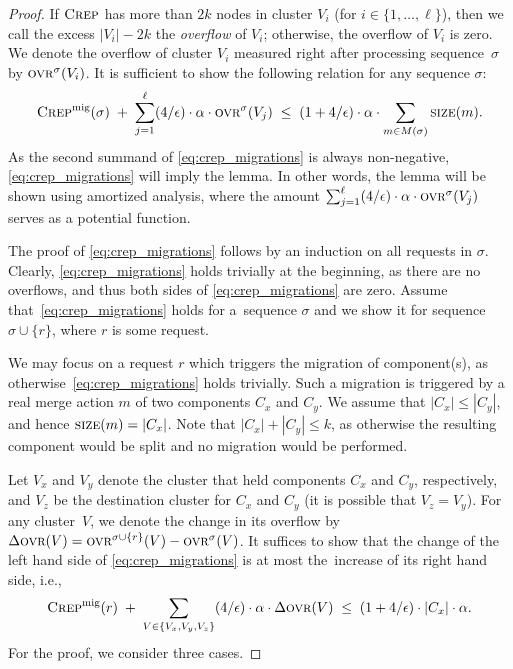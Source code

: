 \begin{proof}
If $\textsc{Crep}$ has more than $2 k$ nodes in cluster $V_i$ (for $i \in
\{1,\ldots,\ell\}$), then we call the excess $|V_i| - 2 k$ the \emph{overflow} of $V_i$;
otherwise, the overflow of $V_i$ is zero. We denote the overflow of cluster
$V_i$ measured right after processing sequence~$\sigma$ by $\textsc{ovr}^\sigma(V_i)$.
It is sufficient to show the following relation for any sequence $\sigma$:
\begin{equation}
\label{eq:crep_migrations}
 \textsc{Crep}^\textnormal{mig}(\sigma) \;+\; \sum_{j=1}^\ell (4/\epsilon) \cdot \alpha \cdot \textsc{ovr}^\sigma(V_j) 
 \; \leq \; (1+4/\epsilon)  \cdot \alpha \cdot \sum_{m \in M(\sigma)} \textsc{size}(m).
\end{equation}
As the second summand of \eqref{eq:crep_migrations} is always non-negative,
\eqref{eq:crep_migrations} will imply the lemma. 
In other words, the lemma will be shown using amortized analysis, where
the amount $\sum_{j=1}^\ell (4/\epsilon) \cdot \alpha \cdot \textsc{ovr}^\sigma(V_j)$ serves 
as a potential function.

The proof of \eqref{eq:crep_migrations} follows by an induction on all
requests in $\sigma$. Clearly, \eqref{eq:crep_migrations} holds trivially at the
beginning, as there are no overflows, and thus both sides of
\eqref{eq:crep_migrations} are zero. Assume that~\eqref{eq:crep_migrations}
holds for a~sequence $\sigma$ and we show it for sequence $\sigma \cup \{ r \}$,
where $r$ is some request.

We may focus on a request $r$ which triggers the migration of
component(s), as otherwise~\eqref{eq:crep_migrations} holds trivially. Such a migration is triggered by a
real merge action $m$ of two components $C_x$ and $C_y$. We assume that $|C_x|
\leq |C_y|$, and hence $\textsc{size}(m) = |C_x|$. Note that $|C_x| + |C_y| \leq k$,
as otherwise the resulting component would be split and no migration would
be performed.

Let $V_x$ and $V_y$ denote the cluster that held components $C_x$ and $C_y$,
respectively, and $V_z$ be the destination cluster for $C_x$ and $C_y$ (it is
possible that $V_z = V_y$). For any cluster~$V$, we denote the change in 
its overflow by $\Delta \textsc{ovr}(V) = \textsc{ovr}^{\sigma \cup \{r\}}(V) - \textsc{ovr}^\sigma(V)$. 
It suffices to show that the
change of the left hand side of \eqref{eq:crep_migrations} is at most
the~increase of its right hand side, i.e.,
\begin{equation}
\label{eq:crep_mig_inc}
\textsc{Crep}^\textnormal{mig}(r) \;+\; \sum_{V \in \{ V_x, V_y, V_z \}} (4/\epsilon) \cdot \alpha \cdot \Delta\textsc{ovr}(V) 
\;\leq\; (1+4/\epsilon) \cdot |C_x| \cdot \alpha.
\end{equation}
For the proof, we consider three cases.


\end{proof}
